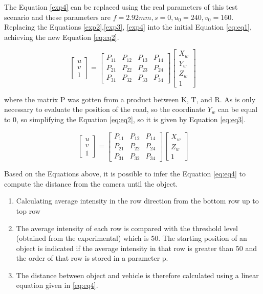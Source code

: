 The Equation \ref{exp4} can be replaced using the real parameters of this test scenario and these parameters are $f = 2.92 mm, s=0, u_0=240, v_0=160$. Replacing the Equations \ref{exp2},\ref{exp3}, \ref{exp4} into the initial Equation \ref{eq:eq1}, achieving the new Equation \ref{eq:eq2}.

\begin{equation}
    \begin{bmatrix}
u\\ 
v\\ 
1
\end{bmatrix}
=\begin{bmatrix}
P_{11} & P_{12} & P_{13} & P_{14}\\ 
P_{21} & P_{22} & P_{23} & P_{24}\\ 
P_{31} & P_{32} & P_{33} & P_{34}
\end{bmatrix}
\begin{bmatrix}
X_w\\ 
Y_w\\ 
Z_w\\
1
\end{bmatrix}
\label{eq:eq2}
\end{equation}

where the matrix P was gotten from a product between K, T, and R. As is only necessary to evaluate the position of the road, so the coordinate $Y_w$ can be equal to 0, so simplifying the Equation \ref{eq:eq2}, so it is given by Equation \ref{eq:eq3}.

\begin{equation}
    \label{eq:eq3}
    \begin{bmatrix}
u\\ 
v\\ 
1
\end{bmatrix}
=\begin{bmatrix}
P_{11} & P_{12}  & P_{14}\\ 
P_{21} & P_{22}  & P_{24}\\ 
P_{31} & P_{32}  & P_{34}
\end{bmatrix}
\begin{bmatrix}
X_w\\ 
Z_w\\
1
\end{bmatrix}
\end{equation}

Based on the Equations above, it is possible to infer the Equation \ref{eq:eq4} to compute the distance from the camera until the object. 

\begin{enumerate}
    \item Calculating average intensity in the row direction from the bottom row up to top row
    \item The average intensity of each row is compared with the threshold level (obtained from the experimental) which is 50. The starting position of an object is indicated if the average intensity in that row is greater than 50 and the order of that row is stored in a parameter p.
    \item The distance between object and vehicle is therefore calculated using a linear equation given in \ref{eq:eq4}.
\end{enumerate}

